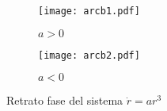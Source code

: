 \begin{ejemplo}
  \begin{figure}[H]
    \begin{subfigure}[b]{0.49\textwidth}
      \texttt{[image: arcb1.pdf]}
      \caption{$a>0$}
    \end{subfigure}
    \hfill
    \begin{subfigure}[b]{0.49\textwidth}
      \texttt{[image: arcb2.pdf]}
      \caption{$a<0$}
    \end{subfigure}
    \caption{Retrato fase del sistema $\dot{r}=ar^3$}
  \end{figure}
  
\end{ejemplo}

